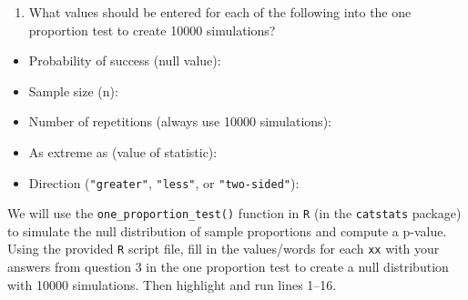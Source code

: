 \documentclass[
]{report}
\providecommand{\tightlist}{%
  \setlength{\itemsep}{0pt}\setlength{\parskip}{0pt}}
\begin{document}
\begin{enumerate}
\def\labelenumi{\arabic{enumi}.}
\setcounter{enumi}{2}
\tightlist
\item
  What values should be entered for each of the following into the one proportion test to create 10000 simulations?
\end{enumerate}

\vspace{1mm}

\begin{itemize}
\tightlist
\item
  Probability of success (null value):
\end{itemize}

\vspace{.2in}

\begin{itemize}
\tightlist
\item
  Sample size (n):
\end{itemize}

\vspace{.2in}

\begin{itemize}
\tightlist
\item
  Number of repetitions (always use 10000 simulations):
\end{itemize}

\vspace{.2in}

\begin{itemize}
\tightlist
\item
  As extreme as (value of statistic):
\end{itemize}

\vspace{.2in}

\begin{itemize}
\tightlist
\item
  Direction (\texttt{"greater"}, \texttt{"less"}, or \texttt{"two-sided"}):
\end{itemize}

We will use the \texttt{one\_proportion\_test()} function in \texttt{R} (in the \texttt{catstats} package) to simulate the null distribution of sample proportions and compute a p-value. Using the provided \texttt{R} script file, fill in the values/words for each \texttt{xx} with your answers from question 3 in the one proportion test to create a null distribution with 10000 simulations. Then highlight and run lines 1--16.
\end{document}
